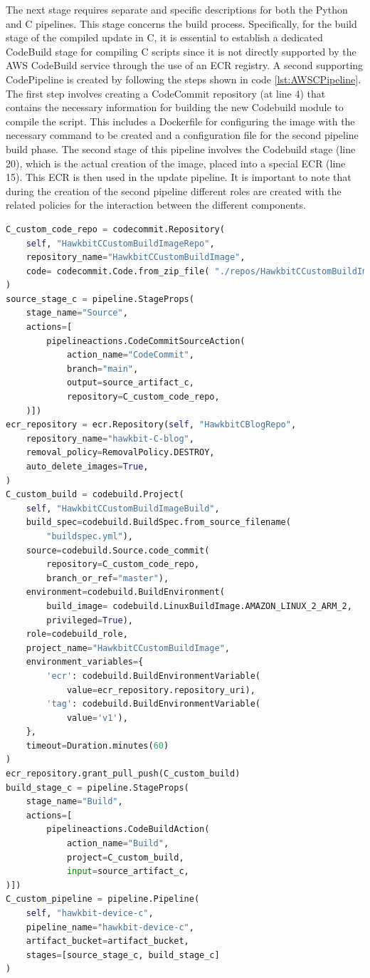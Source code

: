 The next stage requires separate and specific descriptions for both the Python and C pipelines. This stage concerns the build process. Specifically, for the build stage of the compiled update in C, it is essential to establish a dedicated CodeBuild stage for compiling C scripts since it is not directly supported by the AWS CodeBuild service through the use of an ECR registry. A second supporting CodePipeline is created by following the steps shown in code \ref{lst:AWSCPipeline}. The first step involves creating a CodeCommit repository (at line 4) that contains the necessary information for building the new Codebuild module to compile the script. This includes a Dockerfile for configuring the image with the necessary command to be created and a configuration file for the second pipeline build phase. The second stage of this pipeline involves the Codebuild stage (line 20), which is the actual creation of the image, placed into a special ECR (line 15). This ECR is then used in the update pipeline. It is important to note that during the creation of the second pipeline different roles are created with the related policies for the interaction between the different components.
\begin{lstlisting}[language=Python, caption={CDK Code for the Codepipeline for the C compiled file build creation}, label=lst:AWSCPipeline]
C_custom_code_repo = codecommit.Repository(
    self, "HawkbitCCustomBuildImageRepo",
    repository_name="HawkbitCCustomBuildImage",
    code= codecommit.Code.from_zip_file( "./repos/HawkbitCCustomBuildImage.zip", "main" )
)
source_stage_c = pipeline.StageProps(
    stage_name="Source",
    actions=[
        pipelineactions.CodeCommitSourceAction(
            action_name="CodeCommit",
            branch="main",
            output=source_artifact_c,
            repository=C_custom_code_repo,
    )])
ecr_repository = ecr.Repository(self, "HawkbitCBlogRepo",
    repository_name="hawkbit-C-blog",
    removal_policy=RemovalPolicy.DESTROY,
    auto_delete_images=True,
)
C_custom_build = codebuild.Project(
    self, "HawkbitCCustomBuildImageBuild",
    build_spec=codebuild.BuildSpec.from_source_filename(
        "buildspec.yml"),
    source=codebuild.Source.code_commit(
        repository=C_custom_code_repo,
        branch_or_ref="master"),
    environment=codebuild.BuildEnvironment(
        build_image= codebuild.LinuxBuildImage.AMAZON_LINUX_2_ARM_2,
        privileged=True),
    role=codebuild_role,
    project_name="HawkbitCCustomBuildImage",
    environment_variables={
        'ecr': codebuild.BuildEnvironmentVariable(
            value=ecr_repository.repository_uri),
        'tag': codebuild.BuildEnvironmentVariable(
            value='v1'),
    },
    timeout=Duration.minutes(60)
)
ecr_repository.grant_pull_push(C_custom_build)
build_stage_c = pipeline.StageProps(
    stage_name="Build",
    actions=[
        pipelineactions.CodeBuildAction(
            action_name="Build",
            project=C_custom_build,
            input=source_artifact_c,
)])
C_custom_pipeline = pipeline.Pipeline(
    self, "hawkbit-device-c",
    pipeline_name="hawkbit-device-c",
    artifact_bucket=artifact_bucket,
    stages=[source_stage_c, build_stage_c]
)
\end{lstlisting}

